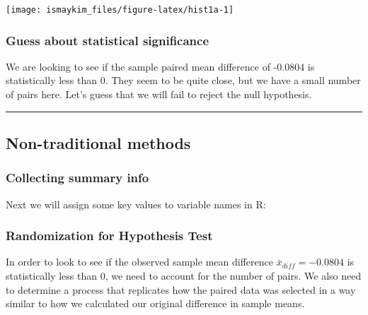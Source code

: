 \documentclass[]{tufte-book}
\newenvironment{Shaded}{\begin{snugshade}}{\end{snugshade}}
\newcommand{\StringTok}[1]{\textcolor[rgb]{0.31,0.60,0.02}{{#1}}}
\newcommand{\NormalTok}[1]{{#1}}
\let\oldrule=\rule
\renewcommand{\rule}[1]{\oldrule{\linewidth}}
\theoremstyle{definition}
\theoremstyle{definition}
\theoremstyle{remark}
\begin{document}
\begin{center}\texttt{[image: ismaykim\_files/figure-latex/hist1a-1]} \end{center}

\subsubsection{Guess about statistical
significance}\label{guess-about-statistical-significance-4}

We are looking to see if the sample paired mean difference of -0.0804 is
statistically less than 0. They seem to be quite close, but we have a
small number of pairs here. Let's guess that we will fail to reject the
null hypothesis.

\begin{center}\rule{0.5\linewidth}{\linethickness}\end{center}

\subsection{Non-traditional methods}\label{non-traditional-methods-4}

\subsubsection{Collecting summary info}\label{collecting-summary-info-2}

Next we will assign some key values to variable names in R:

\begin{Shaded}
\end{Shaded}

\subsubsection{Randomization for Hypothesis
Test}\label{randomization-for-hypothesis-test-2}

In order to look to see if the observed sample mean difference
\(\bar{x}_{diff} = -0.0804\) is statistically less than 0, we need to
account for the number of pairs. We also need to determine a process
that replicates how the paired data was selected in a way similar to how
we calculated our original difference in sample means.
\end{document}
